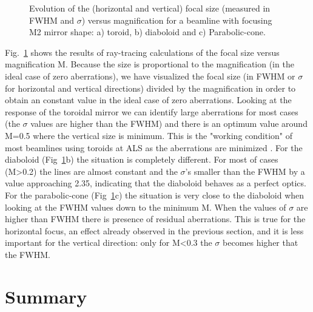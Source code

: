 \documentclass{iucr}              %
\begin{document}
\begin{figure}[h]
\caption{\label{fig:scan}
Evolution of the (horizontal and vertical) focal size (measured in FWHM and $\sigma$) versus magnification for a beamline with focusing M2 mirror shape: a) toroid, b) diaboloid and c) Parabolic-cone. 
}
\end{figure}


Fig.~\ref{fig:scan} shows the results of ray-tracing calculations of the focal size versus magnification M. Because the size is proportional to the magnification (in the ideal case of zero aberrations), we have visualized the focal size (in FWHM or $\sigma$ for horizontal and vertical directions) divided by the magnification in order to obtain an constant value in the ideal case of zero aberrations. Looking at the response of the toroidal mirror we can identify large aberrations for most cases (the $\sigma$ values are higher than the FWHM) and there is an optimum value around M=0.5 where the vertical size is minimum. This is the "working condition" of most beamlines using toroids at ALS as the aberrations are minimized \cite{padmore2000,howells2000}. For the diaboloid (Fig~\ref{fig:scan}b) the situation is completely different. For most of cases (M>0.2) the lines are almost constant and the $\sigma$'s smaller than the FWHM by a value approaching 2.35, indicating that the diaboloid behaves as a perfect optics. For the parabolic-cone (Fig~\ref{fig:scan}c) the situation is very close to the diaboloid when looking at the FWHM values down to the minimum M. When the values of $\sigma$ are higher than FWHM there is presence of residual aberrations. This is true for the horizontal focus, an effect already observed in the previous section, and it is less important for the vertical direction: only for M<0.3 the $\sigma$ becomes higher that the FWHM.  



\section{Summary}
\label{sec:summary}
\end{document}
